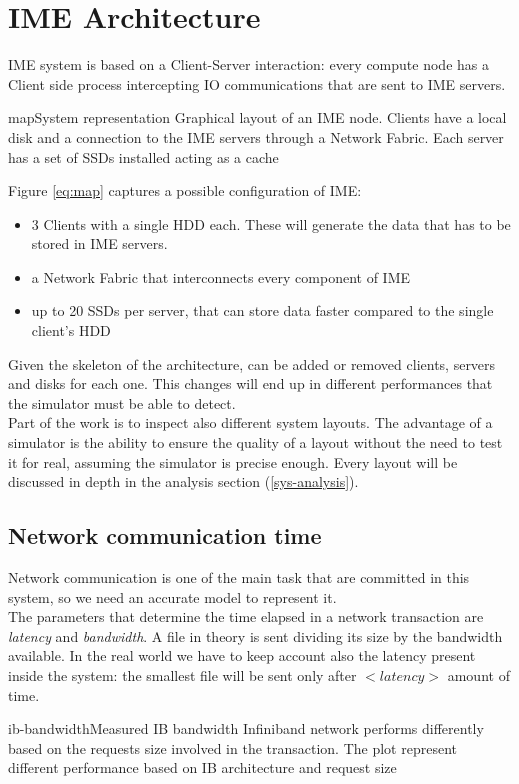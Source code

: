 
\chapter{IME Architecture}
IME system is based on a Client-Server interaction: every compute node has a
Client side process intercepting IO communications that are sent to IME servers.
\begin{myimage}{map}{System representation}
    Graphical layout of an IME node. Clients have a local disk and a connection
    to the IME servers through a Network Fabric. Each server has a set of SSDs
    installed acting as a cache
\end{myimage}
Figure \ref{eq:map} captures a possible configuration of IME:
\begin{itemize}
    \item 3 Clients with a single HDD each. These will generate the data that
        has to be stored in IME servers.
    \item a Network Fabric that interconnects every component of IME
    \item up to 20 SSDs per server, that can store data faster compared to the single
        client's HDD
\end{itemize}

Given the skeleton of the architecture, can be added or removed clients,
servers and disks for each one. This changes will end up in different performances
that the simulator must be able to detect. \\
Part of the work is to inspect also different system layouts. The advantage of a
simulator is the ability to ensure the quality of a layout without the need to
test it for real, assuming the simulator is precise enough.
Every layout will be discussed in depth in the analysis section
(\ref{sys-analysis}).

\section{Network communication time}\label{netbuff}
Network communication is one of the main task that are committed in this system,
so we need an accurate model to represent it. \\
The parameters that determine the time elapsed in a network transaction are
\textit{latency} and \textit{bandwidth}. A file in theory is sent dividing
its size by the bandwidth available. In the real world we have to keep account also
the latency present inside the system: the smallest file will be sent
only after $<latency>$ amount of time. \\
\begin{myimage}{ib-bandwidth}{Measured IB bandwidth}
    Infiniband network performs differently based on the requests size involved
    in the transaction. The plot represent different performance based on IB
    architecture and request size
\end{myimage}


